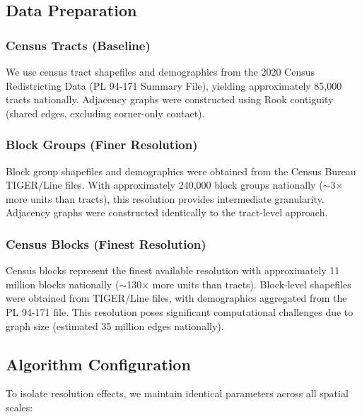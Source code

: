 
\subsection{Data Preparation}

\subsubsection{Census Tracts (Baseline)}

We use census tract shapefiles and demographics from the 2020 Census Redistricting Data (PL 94-171 Summary File), yielding approximately 85,000 tracts nationally. Adjacency graphs were constructed using Rook contiguity (shared edges, excluding corner-only contact).

\subsubsection{Block Groups (Finer Resolution)}

Block group shapefiles and demographics were obtained from the Census Bureau TIGER/Line files. With approximately 240,000 block groups nationally ($\sim$3$\times$ more units than tracts), this resolution provides intermediate granularity. Adjacency graphs were constructed identically to the tract-level approach.

\subsubsection{Census Blocks (Finest Resolution)}

Census blocks represent the finest available resolution with approximately 11 million blocks nationally ($\sim$130$\times$ more units than tracts). Block-level shapefiles were obtained from TIGER/Line files, with demographics aggregated from the PL 94-171 file. This resolution poses significant computational challenges due to graph size (estimated 35 million edges nationally).


\subsection{Algorithm Configuration}

To isolate resolution effects, we maintain identical parameters across all spatial scales:

